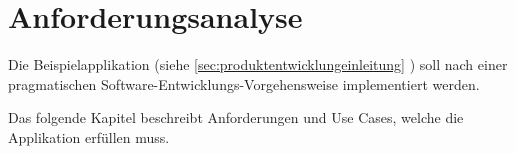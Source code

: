 \chapter{Anforderungsanalyse}

Die Beispielapplikation (siehe \ref{sec:produktentwicklungeinleitung} ) soll nach einer pragmatischen Software-Entwicklungs-Vorgehensweise implementiert werden.

Das folgende Kapitel beschreibt Anforderungen und Use Cases, welche die Applikation erfüllen muss.




